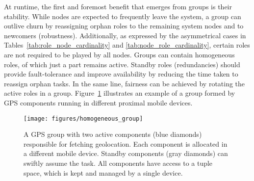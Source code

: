 

At runtime, the first and foremost benefit that emerges from groups is their stability. While nodes are expected to frequently leave the system, a group can outlive churn by reassigning orphan roles to the remaining system nodes and to newcomers (robustness). 
Additionally, as expressed by the asymmetrical cases in Tables~\ref{tab:role_node_cardinality} and \ref{tab:node_role_cardinality}, certain roles are not required to be played by all nodes. Groups can contain homogeneous roles, of which just a part remains active. Standby roles (redundancies) should provide fault-tolerance and improve availability by reducing the time taken to reassign orphan tasks. In the same line, fairness can be achieved by rotating the active roles in a group.
Figure~\ref{fig:homogeneous_group} illustrates an example of a group formed by GPS components running in different proximal mobile devices.

\begin{figure}[t!]
	\centering
	\texttt{[image: figures/homogeneous\_group]}
	\caption{A GPS group with two active components (blue diamonds) responsible for fetching geolocation. Each component is allocated in a different mobile device. Standby components (gray diamonds) can swiftly assume the task. All components have access to a tuple space, which is kept and managed by a single device.}
	\label{fig:homogeneous_group}
\end{figure}






